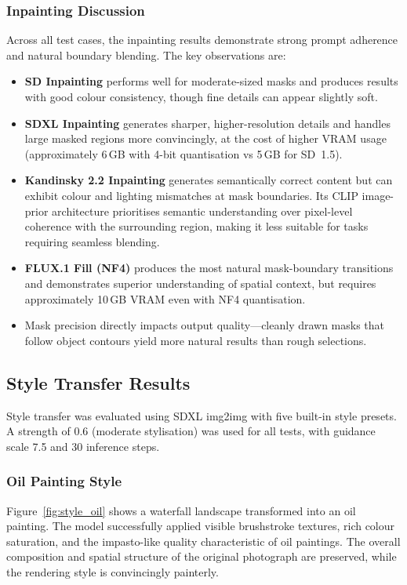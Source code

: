 \documentclass[12pt,a4paper]{report}
\begin{document}
\subsubsection{Inpainting Discussion}

Across all test cases, the inpainting results demonstrate strong prompt adherence and natural boundary blending. The key observations are:

\begin{itemize}
    \item \textbf{SD Inpainting} performs well for moderate-sized masks and produces results with good colour consistency, though fine details can appear slightly soft.
    \item \textbf{SDXL Inpainting} generates sharper, higher-resolution details and handles large masked regions more convincingly, at the cost of higher VRAM usage (approximately 6\,GB with 4-bit quantisation vs 5\,GB for SD~1.5).
    \item \textbf{Kandinsky 2.2 Inpainting} generates semantically correct content but can exhibit colour and lighting mismatches at mask boundaries. Its CLIP image-prior architecture prioritises semantic understanding over pixel-level coherence with the surrounding region, making it less suitable for tasks requiring seamless blending.
    \item \textbf{FLUX.1 Fill (NF4)} produces the most natural mask-boundary transitions and demonstrates superior understanding of spatial context, but requires approximately 10\,GB VRAM even with NF4 quantisation.
    \item Mask precision directly impacts output quality---cleanly drawn masks that follow object contours yield more natural results than rough selections.
\end{itemize}

\subsection{Style Transfer Results}

Style transfer was evaluated using SDXL img2img with five built-in style presets. A strength of 0.6 (moderate stylisation) was used for all tests, with guidance scale 7.5 and 30 inference steps.

\subsubsection{Oil Painting Style}

Figure~\ref{fig:style_oil} shows a waterfall landscape transformed into an oil painting. The model successfully applied visible brushstroke textures, rich colour saturation, and the impasto-like quality characteristic of oil paintings. The overall composition and spatial structure of the original photograph are preserved, while the rendering style is convincingly painterly.
\end{document}
